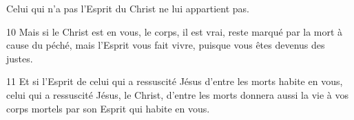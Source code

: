 Celui qui n’a pas l’Esprit du Christ ne lui appartient pas.

10 Mais si le Christ est en vous, le corps, il est vrai, reste marqué par la mort à cause du péché, mais l’Esprit vous fait vivre, puisque vous êtes devenus des justes.

11 Et si l’Esprit de celui qui a ressuscité Jésus d’entre les morts habite en vous, celui qui a ressuscité Jésus, le Christ, d’entre les morts donnera aussi la vie à vos corps mortels par son Esprit qui habite en vous.